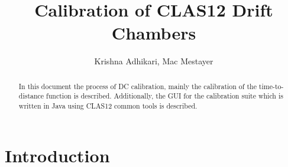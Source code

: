 \documentclass[12pt,epsfig]{article}
\begin{document}
\title{Calibration of CLAS12 Drift Chambers}
\author{Krishna Adhikari, Mac Mestayer}

\maketitle

\begin{abstract}
In this document the process of DC calibration, mainly the calibration of the time-to-distance function is described. Additionally, the GUI for the calibration suite which is written in Java using CLAS12 common tools is described.
\end{abstract}

\tableofcontents

\pagebreak



\section{Introduction}
\FloatBarrier
\end{document}
